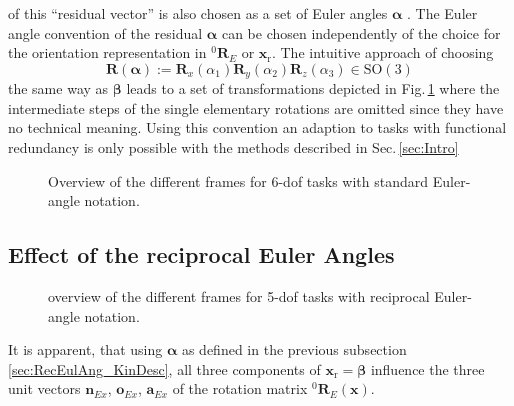 \documentclass[twocolumn,10pt]{IFTOMM}
\newcommand{\bm}[1]{\boldsymbol{#1}}
\newcommand{\vek}[3]{\boldsymbol{#1}^{#2}_{#3}}
\newcommand{\rotmat}[2]{{{ }^{#1}\boldsymbol{R}}_{#2}}
\newcommand{\transp}[0]{{\mathrm{T}}}
\begin{document}
%
of this ``residual vector'' is also chosen as a set of Euler angles $\bm{\alpha}$ \cite{GoldenbergBenFen1985}.
The Euler angle convention of the residual $\bm{\alpha}$ can be chosen independently of the choice for the orientation representation in $\rotmat{0}{E}$ or $\bm{x}_{\mathrm{r}}$.
The intuitive approach of choosing
%
\begin{equation}
\bm{R}(\bm{\alpha}) := \bm{R}_x(\alpha_1) \bm{R}_y(\alpha_2) \bm{R}_z(\alpha_3) \in \mathrm{SO(3)}
\end{equation}
%
the same way as $\bm{\beta}$ leads to a set of transformations depicted in Fig.\,\ref{fig:frames_6dof} where the intermediate steps of the single elementary rotations are omitted since they have no technical meaning.
Using this convention an adaption to tasks with functional redundancy is only possible with the methods described in Sec.\,\ref{sec:Intro}

\begin{figure}[tb!]
    
    \caption{Overview of the different frames for 6-dof tasks with standard Euler-angle notation.}
    \label{fig:frames_6dof}
\end{figure} 

\subsection{Effect of the reciprocal Euler Angles}
\label{sec:RecEulAng_effect}



\begin{figure}[tb!]
    
    \caption{overview of the different frames for 5-dof tasks with reciprocal Euler-angle notation.}
    \label{fig:frames_5dof}
\end{figure} 



It is apparent, that using $\bm{\alpha}$ as defined in the previous subsection\,\ref{sec:RecEulAng_KinDesc}, all three components of $\bm{x}_{\mathrm{r}}=\bm{\beta}$ influence the three unit vectors $\bm{n}_{Ex}$, $\bm{o}_{Ex}$, $\bm{a}_{Ex}$ of the rotation matrix $\rotmat{0}{E}(\bm{x})$.
\end{document}
